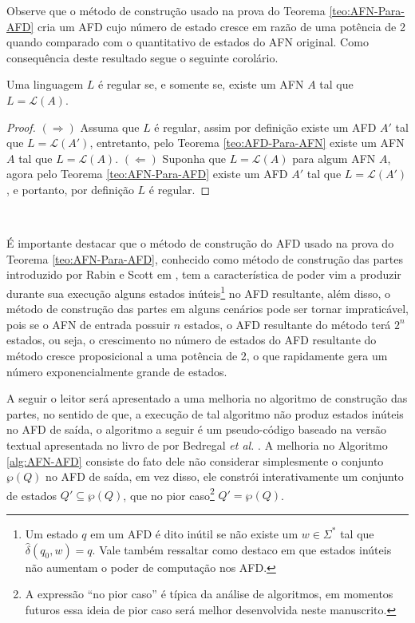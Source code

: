 Observe que o método de construção usado na prova do Teorema \ref{teo:AFN-Para-AFD} cria um AFD cujo número de estado cresce em razão de uma potência de 2 quando comparado com o quantitativo de estados do AFN original. Como consequência deste resultado segue o seguinte corolário.

\begin{corollary}
	Uma linguagem $L$ é regular se, e somente se, existe um AFN $A$ tal que $L = \mathcal{L}(A)$.
\end{corollary}

\begin{proof}
	$(\Rightarrow)$ Assuma que $L$ é regular, assim por definição existe um AFD $A'$ tal que $L = \mathcal{L}(A')$, entretanto, pelo Teorema \ref{teo:AFD-Para-AFN} existe um AFN $A$ tal que $L = \mathcal{L}(A)$. $(\Leftarrow)$ Suponha que $L = \mathcal{L}(A)$ para algum AFN $A$, agora pelo Teorema \ref{teo:AFN-Para-AFD} existe um AFD $A'$ tal que $L = \mathcal{L}(A')$, e portanto, por definição $L$ é regular.
\end{proof}

\

É importante destacar que o método de construção do AFD usado na prova do Teorema \ref{teo:AFN-Para-AFD}, conhecido como método de construção das partes introduzido por Rabin e Scott em \cite{rabin1959}, tem a característica de poder vim a produzir durante sua execução alguns estados inúteis\footnote{Um estado $q$ em um AFD é dito inútil se não existe um $w \in \Sigma^*$ tal que $\widehat{\delta}(q_0, w) = q$. Vale também ressaltar como destaco em \cite{benjaLivro2010, hopcroft2008} que estados inúteis não aumentam o poder de computação nos AFD.} no AFD resultante, além disso,  o método de construção das partes em alguns cenários pode ser tornar impraticável, pois se o AFN de entrada possuir $n$ estados, o AFD resultante do método terá $2^n$ estados, ou seja, o crescimento no número de estados do AFD resultante do método cresce proposicional a uma potência de 2, o que rapidamente gera um número exponencialmente grande de estados. 

A seguir o leitor será apresentado a uma melhoria no algoritmo de construção das partes, no sentido de que, a execução de tal algoritmo não produz estados inúteis no AFD de saída, o algoritmo a seguir é um pseudo-código baseado na versão textual apresentada no livro de por Bedregal \textit{et al.} \cite{benjaLivro2010}. A melhoria no Algoritmo \ref{alg:AFN-AFD} consiste do fato dele não considerar simplesmente o conjunto $\wp(Q)$ no AFD de saída, em vez disso, ele constrói interativamente um conjunto de estados $Q' \subseteq \wp(Q)$, que no pior caso\footnote{A expressão ``no pior caso'' é típica da análise de algoritmos, em momentos futuros essa ideia de pior caso será melhor desenvolvida neste manuscrito.} $Q' = \wp(Q)$.

